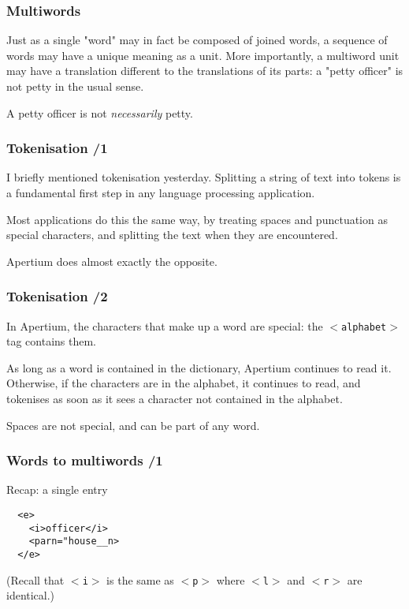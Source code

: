 \documentclass{beamer} %
\begin{document}
\begin{frame}
  \frametitle{Multiwords}
  Just as a single "word" may in fact be composed of joined words, 
  a sequence of words may have a unique meaning as a unit.
  More importantly, a multiword unit may have a translation different
  to the translations of its parts: a "petty officer" is not petty in
  the usual sense.

  \pause

  A petty officer is not {\it necessarily} petty.

\end{frame}
\begin{frame}
  \frametitle{Tokenisation /1}
  I briefly mentioned tokenisation yesterday. Splitting a string of text into tokens
  is a fundamental first step in any language processing application.

  Most applications do this the same way, by treating spaces and punctuation as
  special characters, and splitting the text when they are encountered.

  \pause

   Apertium does almost exactly the opposite.
\end{frame}
\begin{frame}
  \frametitle{Tokenisation /2}
  In Apertium, the characters that make up a word are special: the 
  {\tt $<$alphabet$>$} tag contains them.

  As long as a word is contained in the dictionary, Apertium continues to 
  read it. Otherwise, if the characters are in the alphabet, it continues
  to read, and tokenises as soon as it sees a character not contained in
  the alphabet.

  \pause

  Spaces are not special, and can be part of any word.
\end{frame}
\begin{frame}
  \frametitle{Words to multiwords /1}

  \begin{exampleblock}{Recap: a single entry}
    \begin{footnotesize}
    \begin{alltt}
      ~~<e> \\
      ~~~~<i>officer</i> \\
      ~~~~<par n="house\_\_n> \\
      ~~</e> \\
    \end{alltt}
    \end{footnotesize}
  \end{exampleblock}

  (Recall that {\tt $<$i$>$} is the same as {\tt $<$p$>$}
  where {\tt $<$l$>$} and {\tt $<$r$>$} are identical.)
\end{frame}
\end{document}

